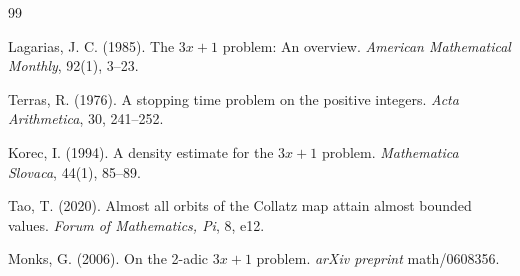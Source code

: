 \documentclass[11pt,a4paper]{article}
\begin{document}
\begin{thebibliography}{99}
\setlength{\itemsep}{0.5em}

Lagarias, J. C. (1985).
The \( 3x + 1 \) problem: An overview.
\textit{American Mathematical Monthly}, 92(1), 3--23.

Terras, R. (1976).
A stopping time problem on the positive integers.
\textit{Acta Arithmetica}, 30, 241--252.

Korec, I. (1994).
A density estimate for the \( 3x+1 \) problem.
\textit{Mathematica Slovaca}, 44(1), 85--89.

Tao, T. (2020).
Almost all orbits of the Collatz map attain almost bounded values.
\textit{Forum of Mathematics, Pi}, 8, e12.

Monks, G. (2006).
On the 2-adic \( 3x+1 \) problem.
\textit{arXiv preprint} math/0608356.

\end{thebibliography}
\end{document}
